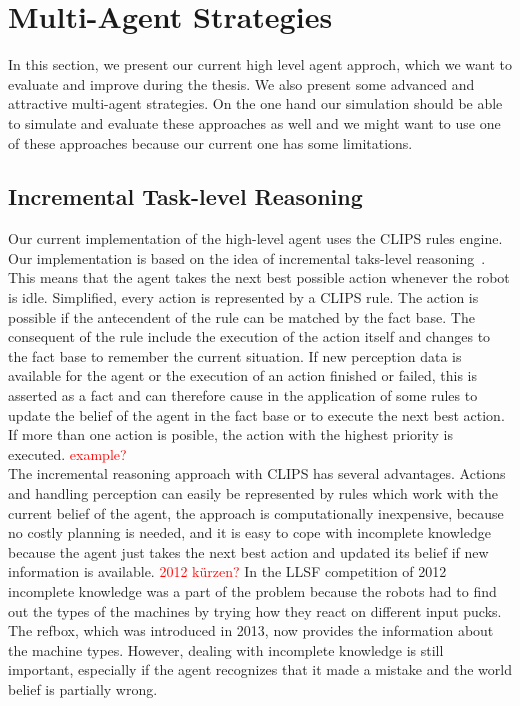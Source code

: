 \section{Multi-Agent Strategies}
In this section, we present our current high level agent approch, which we want to evaluate and improve during the thesis. We also present some advanced and attractive multi-agent strategies. On the one hand our simulation should be able to simulate and evaluate these approaches as well and we might want to use one of these approaches because our current one has some limitations.

\subsection{Incremental Task-level Reasoning}
Our current implementation of the high-level agent uses the CLIPS rules engine. Our implementation is based on the idea of incremental taks-level reasoning~\cite{Incremental}. This means that the agent takes the next best possible action whenever the robot is idle. Simplified, every action is represented by a CLIPS rule. The action is possible if the antecendent of the rule can be matched by the fact base. The consequent of the rule include the execution of the action itself and changes to the fact base to remember the current situation. If new perception data is available for the agent or the execution of an action finished or failed, this is asserted as a fact and can therefore cause in the application of some rules to update the belief of the agent in the fact base or to execute the next best action. If more than one action is posible, the action with the highest priority is executed. \textcolor{red}{example?}\\
The incremental reasoning approach with CLIPS has several advantages. Actions and handling perception can easily be represented by rules which work with the current belief of the agent, the approach is computationally inexpensive, because no costly planning is needed, and it is easy to cope with incomplete knowledge because the agent just takes the next best action and updated its belief if new information is available. \textcolor{red}{2012 kürzen?} In the LLSF competition of 2012 incomplete knowledge was a part of the problem because the robots had to find out the types of the machines by trying how they react on different input pucks. The refbox, which was introduced in 2013, now provides the information about the machine types. However, dealing with incomplete knowledge is still important, especially if the agent recognizes that it made a mistake and the world belief is partially wrong.\\

